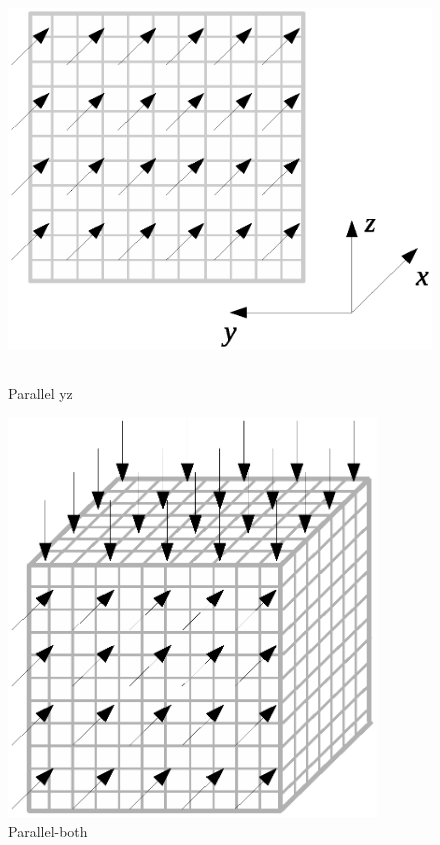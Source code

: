 \documentclass{article}
\begin{document}
\begin{figure}[h]
\begin{center}
\includegraphics[trim={{100pt} {150pt} {100pt} {150pt}}, clip, height=300pt]{img/parallel-yz.eps}
\end{center}
\caption{Parallel yz}
\label{fig:parallel-yz}
\end{figure}




\begin{figure}[h]
\begin{center}
\includegraphics[trim={{100pt} {150pt} {100pt} {150pt}}, clip, height=300pt]{img/parallel-both.eps}
\end{center}
\caption{Parallel-both}
\label{fig:parallel-both}
\end{figure}
\end{document}
